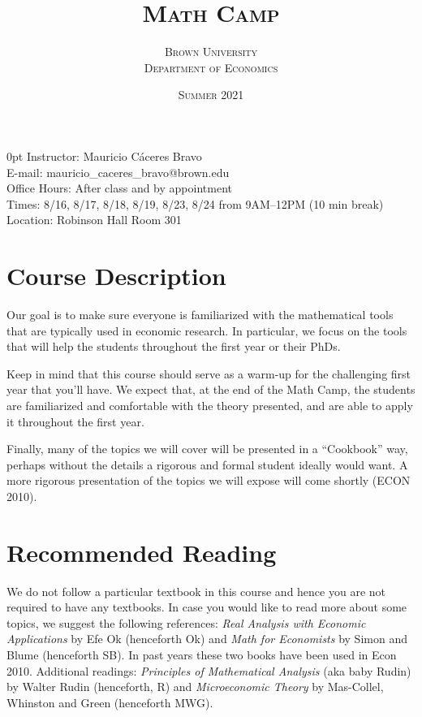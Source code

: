 \documentclass[11pt]{article}
\title{\bfseries\scshape Math Camp}
\author{\scshape Brown University \\ \scshape Department of Economics}
\date{\scshape Summer 2021}
\renewcommand{\displayoptions}{\maketitle\pagenumbering{arabic}}
\begin{document}
\displayoptions

{
  \bfseries
  \begin{adjustwidth}{\parindent}{0pt}
    Instructor: Mauricio C\'aceres Bravo \\
    E-mail: mauricio\_caceres\_bravo@brown.edu \\
    Office Hours: After class and by appointment \\[12pt]
    Times: 8/16, 8/17, 8/18, 8/19, 8/23, 8/24 from 9AM--12PM (10 min break) \\
    Location: Robinson Hall Room 301
  \end{adjustwidth}
  \vspace{12pt}
}

\section{Course Description}
\label{sec:course_description}

Our goal is to make sure everyone is familiarized with the mathematical tools that are typically used in economic research. In particular, we focus on the tools that will help the students throughout the first year or their PhDs.

Keep in mind that this course should serve as a warm-up for the challenging first year that you’ll have. We expect that, at the end of the Math Camp, the students are familiarized and comfortable with the theory presented, and are able to apply it throughout the first year.

Finally, many of the topics we will cover will be presented in a ``Cookbook'' way, perhaps without the details a rigorous and formal student ideally would want. A more rigorous presentation of the topics we will expose will come shortly (ECON 2010).

\section{Recommended Reading}
\label{sec:recommended_reading}

We do not follow a particular textbook in this course and hence you are not required to have any textbooks. In case you would like to read more about some topics, we suggest the following references: \textit{Real Analysis with Economic Applications} by Efe Ok (henceforth Ok) and \textit{Math for Economists} by Simon and Blume (henceforth SB). In past years these two books have been used in Econ 2010. Additional readings: \textit{Principles of Mathematical Analysis} (aka baby Rudin) by Walter Rudin (henceforth, R) and \textit{Microeconomic Theory} by Mas-Collel, Whinston and Green (henceforth MWG).
\end{document}
